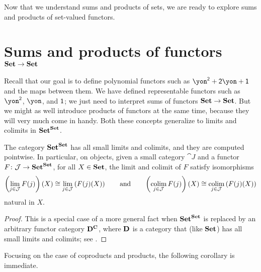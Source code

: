 \documentclass[Book-Poly]{subfiles}
\begin{document}
Now that we understand sums and products of sets, we are ready to explore sums and products of set-valued functors.

\section{Sums and products of functors $\mathbf{Set}\to\mathbf{Set}$} \label{sec.poly.rep-sets.sum-prod-func}

Recall that our goal is to define polynomial functors such as $\yon^\2+\2\yon+\1$ and the maps between them.
We have defined representable functors such as $\yon^\2$, $\yon$, and $\textsf{1}$; we just need to interpret sums of functors $\mathbf{Set}\to\mathbf{Set}$.
But we might as well introduce products of functors at the same time, because they will very much come in handy.
Both these concepts generalize to limits and colimits in $\mathbf{Set}^{\mathbf{Set}}$.

\begin{proposition} \label{prop.presheaf_lim_ptwise}
    The category $\mathbf{Set}^{\mathbf{Set}}$ has all small limits and colimits, and they are computed pointwise.
    In particular, on objects, given a small category $\cat{J}$ and a functor $F\colon \mathcal{J}\to\mathbf{Set}^{\mathbf{Set}}$, for all $X\in\mathbf{Set}$, the limit and colimit of $F$ satisfy isomorphisms
    \[
    \left(\lim_{j\in\mathcal{J}} F(j)\right)(X) \cong \lim_{j\in\mathcal{J}} \left(F(j)(X)\right) \qquad\text{and}\qquad \left(\operatorname*{colim}_{j\in\mathcal{J}} F(j)\right)(X) \cong \operatorname*{colim}_{j\in\mathcal{J}} \left(F(j)(X)\right)
    \]
    natural in $X$.
\end{proposition}
\begin{proof}
    This is a special case of a more general fact when $\mathbf{Set}^{\mathbf{Set}}$ is replaced by an arbitrary functor category $\mathbf{D}^{\mathbf{C}}$, where $\mathbf{D}$ is a category that (like $\mathbf{Set}$) has all small limits and colimits; see \cite[pages 22--23, displays (24) and (25)]{macLane1992sheaves}.
\end{proof}


Focusing on the case of coproducts and products, the following corollary is immediate.
\end{document}
